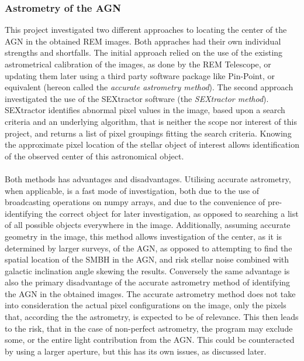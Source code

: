 \documentclass[a4paper, 12pt, twoside]{article}
\begin{document}
\subsubsection{Astrometry of the AGN}
This project investigated two different approaches to locating the center of the AGN in the obtained REM images. Both appraches had their own individual strengths and shortfalls. The initial approach relied on the use of the existing astrometrical calibration of the images, as done by the REM Telescope, or updating them later using a third party software package like Pin-Point, or equivalent (hereon called the \emph{accurate astrometry method}). The second approach investigated the use of the SEXtractor software (the \emph{SEXtractor method}). SEXtractor identifies abnormal pixel values in the image, based upon a search criteria and an underlying algorithm, that is neither the scope nor interest of this project, and returns a list of pixel groupings fitting the search criteria. Knowing the approximate pixel location of the stellar object of interest allows identification of the observed center of this astronomical object. \\
\\
Both methods has advantages and disadvantages. Utilising accurate astrometry, when applicable, is a fast mode of investigation, both due to the use of broadcasting operations on numpy arrays, and due to the convenience of pre-identifying the correct object for later investigation, as opposed to searching a list of all possible objects everywhere in the image. Additionally, assuming accurate geometry in the image, this method allows investigation of the center, as it is determined by larger surveys, of the AGN, as opposed to attempting to find the spatial location of the SMBH in the AGN, and risk stellar noise combined with galactic inclination angle skewing the results. Conversely the same advantage is also the primary disadvantage of the accurate astrometry method of identifying the AGN in the obtained images. The accurate astrometry method does not take into consideration the actual pixel configurations on the image, only the pixels that, according the the astrometry, is expected to be of relevance. This then leads to the risk, that in the case of non-perfect astrometry, the program may exclude some, or the entire light contribution from the AGN. This could be counteracted by using a larger aperture, but this has its own issues, as discussed later. \\
\end{document}
